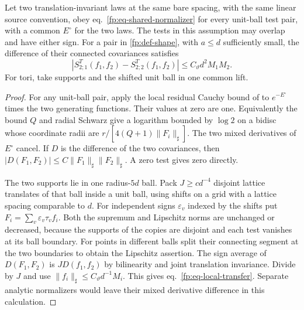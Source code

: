 \documentclass[11pt,letterpaper,reqno]{amsart}
\makeatletter
\numberwithin{equation}{section}
\renewcommand{\eqref}[1]{\textup{eq.~\ref{#1}}}
\theoremstyle{definition}
\newcommand{\ms@minorstart}{%
  \pushQED{\qed}\renewcommand{\qedsymbol}{$\blacksquare$}}
\newenvironment{lemma}[1][]{\ms@minorstart\ms@lemma[#1]}
  {\popQED\endms@lemma}
\theoremstyle{remark}
\makeatother
\begin{document}
\begin{lemma}[Transfer of a local covariance]
\label{fp:lem-local-transfer}
Let two translation-invariant laws at the same bare
spacing, with the same linear source convention, obey
\eqref{fp:eq-shared-normalizer} for every unit-ball test pair,
with a common $E^\circ$ for the two laws. The tests in this
assumption may overlap and have either sign. For a pair in
\cref{fp:def-shape}, with $a\le d$ sufficiently small, the
difference of their connected covariances satisfies
\begin{equation}\label{fp:eq-local-transfer}
 |S_{2;1}^T(f_1,f_2)-S_{2;2}^T(f_1,f_2)|
        \le C_\vartheta d^2 M_1M_2 .
\end{equation}
For tori, take supports and the shifted unit ball in one
common lift.
\end{lemma}

\begin{proof}
For any unit-ball pair, apply the local residual Cauchy bound
of \cite{SI} to $e^{-E^\circ}$ times the two generating
functions. Their values at zero are one. Equivalently the
bound $Q$ and radial Schwarz give a logarithm bounded by
$\log 2$ on a bidisc whose coordinate radii are
$r/[4(Q+1)\|F_i\|_\sharp]$. The two mixed derivatives of
$E^\circ$ cancel. If $D$ is the difference of the two
covariances, then
$|D(F_1,F_2)|\le C\|F_1\|_\sharp\|F_2\|_\sharp$.
A zero test gives zero directly.

The two supports lie in one radius-$5d$ ball. Pack
$J\ge c d^{-4}$ disjoint lattice translates of that ball
inside a unit ball, using shifts on a grid with a lattice
spacing comparable to $d$. For independent signs
$\varepsilon_v$ indexed by the shifts put
$F_i=\sum_v\varepsilon_v\tau_v f_i$. Both the supremum
and Lipschitz norms are unchanged or decreased, because the
supports of the copies are disjoint and each test vanishes
at its ball boundary. For points in different balls split
their connecting segment at the two boundaries to obtain
the Lipschitz assertion. The sign average of $D(F_1,F_2)$
is $J D(f_1,f_2)$ by bilinearity and joint translation
invariance. Divide by $J$ and use
$\|f_i\|_\sharp\le C_\vartheta d^{-1}M_i$.
This gives \eqref{fp:eq-local-transfer}. Separate analytic
normalizers would leave their mixed derivative difference
in this calculation.
\end{proof}
\end{document}
